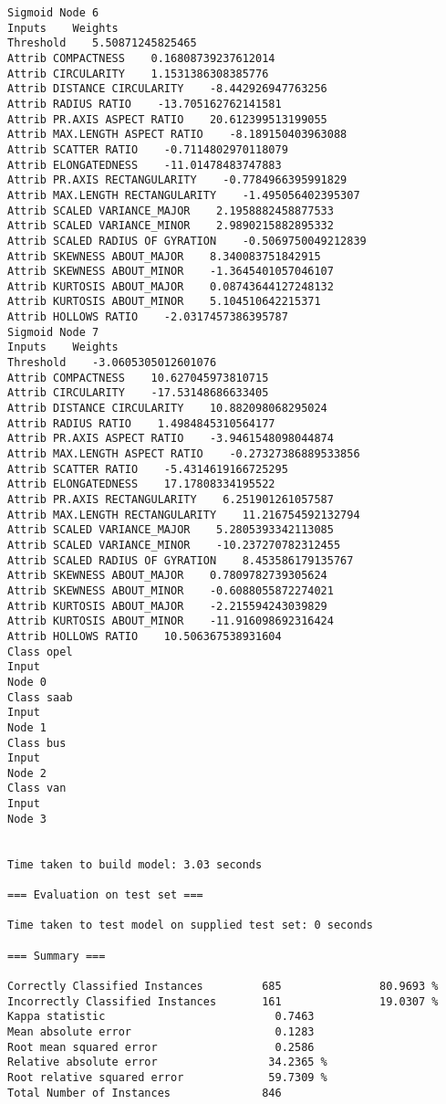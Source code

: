 \documentclass[
	article,			%
	11pt,				%
	oneside,			%
	a4paper,			%
	english,			%
	brazil,				%
	sumario=tradicional
	]{abntex2}
\begin{document}
\begin{lstlisting}
Sigmoid Node 6
Inputs    Weights
Threshold    5.50871245825465
Attrib COMPACTNESS    0.16808739237612014
Attrib CIRCULARITY    1.1531386308385776
Attrib DISTANCE CIRCULARITY    -8.442926947763256
Attrib RADIUS RATIO    -13.705162762141581
Attrib PR.AXIS ASPECT RATIO    20.612399513199055
Attrib MAX.LENGTH ASPECT RATIO    -8.189150403963088
Attrib SCATTER RATIO    -0.7114802970118079
Attrib ELONGATEDNESS    -11.01478483747883
Attrib PR.AXIS RECTANGULARITY    -0.7784966395991829
Attrib MAX.LENGTH RECTANGULARITY    -1.495056402395307
Attrib SCALED VARIANCE_MAJOR    2.1958882458877533
Attrib SCALED VARIANCE_MINOR    2.9890215882895332
Attrib SCALED RADIUS OF GYRATION    -0.5069750049212839
Attrib SKEWNESS ABOUT_MAJOR    8.340083751842915
Attrib SKEWNESS ABOUT_MINOR    -1.3645401057046107
Attrib KURTOSIS ABOUT_MAJOR    0.08743644127248132
Attrib KURTOSIS ABOUT_MINOR    5.104510642215371
Attrib HOLLOWS RATIO    -2.0317457386395787
Sigmoid Node 7
Inputs    Weights
Threshold    -3.0605305012601076
Attrib COMPACTNESS    10.627045973810715
Attrib CIRCULARITY    -17.53148686633405
Attrib DISTANCE CIRCULARITY    10.882098068295024
Attrib RADIUS RATIO    1.4984845310564177
Attrib PR.AXIS ASPECT RATIO    -3.9461548098044874
Attrib MAX.LENGTH ASPECT RATIO    -0.27327386889533856
Attrib SCATTER RATIO    -5.4314619166725295
Attrib ELONGATEDNESS    17.17808334195522
Attrib PR.AXIS RECTANGULARITY    6.251901261057587
Attrib MAX.LENGTH RECTANGULARITY    11.216754592132794
Attrib SCALED VARIANCE_MAJOR    5.2805393342113085
Attrib SCALED VARIANCE_MINOR    -10.237270782312455
Attrib SCALED RADIUS OF GYRATION    8.453586179135767
Attrib SKEWNESS ABOUT_MAJOR    0.7809782739305624
Attrib SKEWNESS ABOUT_MINOR    -0.6088055872274021
Attrib KURTOSIS ABOUT_MAJOR    -2.215594243039829
Attrib KURTOSIS ABOUT_MINOR    -11.916098692316424
Attrib HOLLOWS RATIO    10.506367538931604
Class opel
Input
Node 0
Class saab
Input
Node 1
Class bus
Input
Node 2
Class van
Input
Node 3


Time taken to build model: 3.03 seconds

=== Evaluation on test set ===

Time taken to test model on supplied test set: 0 seconds

=== Summary ===

Correctly Classified Instances         685               80.9693 %
Incorrectly Classified Instances       161               19.0307 %
Kappa statistic                          0.7463
Mean absolute error                      0.1283
Root mean squared error                  0.2586
Relative absolute error                 34.2365 %
Root relative squared error             59.7309 %
Total Number of Instances              846     


\end{lstlisting}
\end{document}
